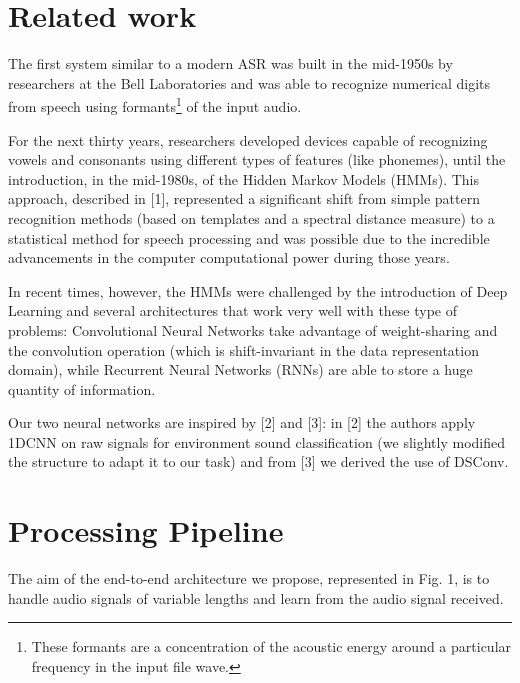 \documentclass[conference]{IEEEtran}
\begin{document}

\section{Related work}
The first system similar to a modern ASR was built in the mid-1950s by researchers at the Bell Laboratories and was able to recognize numerical digits from speech using formants\footnote{These formants are a concentration of the acoustic energy around a particular frequency in the input file wave.} of the input audio.  

For the next thirty years, researchers developed devices capable of recognizing vowels and consonants using different types of features (like phonemes), until the introduction, in the mid-1980s, of the Hidden Markov Models (HMMs). This approach, described in [1], represented a significant shift from simple pattern recognition methods (based on templates and a spectral distance measure) to a statistical method for speech processing and was possible due to the incredible advancements in the computer computational power during those years.

In recent times, however, the HMMs were challenged by the introduction of Deep Learning and several architectures that work very well with these type of problems: Convolutional Neural Networks take advantage of weight-sharing and the convolution operation (which is shift-invariant in the data representation domain), while Recurrent Neural Networks (RNNs) are able to store a huge quantity of information.

Our two neural networks are inspired by [2] and [3]: in [2] the authors apply 1DCNN on raw signals for environment sound classification (we slightly modified the structure to adapt it to our task) and from [3] we derived the use of DSConv.

\section{Processing Pipeline}
The aim of the end-to-end architecture we propose, represented in Fig. 1, is to handle audio signals of variable lengths and learn from the audio signal received.
\end{document}
